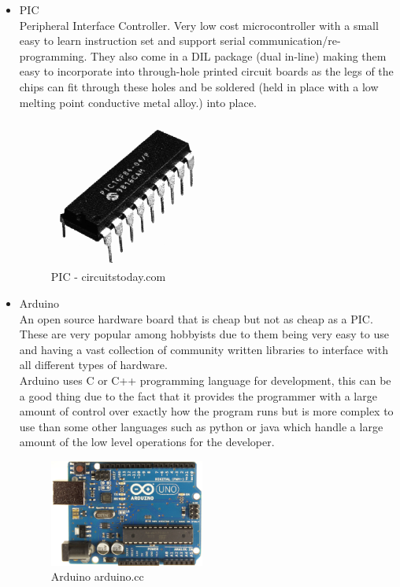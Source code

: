 \begin{itemize}
\item PIC
\\Peripheral Interface Controller.  Very low cost microcontroller with a small easy to learn instruction set and support serial communication/re-programming.  They also come in a DIL package (dual in-line) making them easy to incorporate into through-hole printed circuit boards as the legs of the chips can fit through these holes and be soldered (held in place with a low melting point conductive metal alloy.) into place.
\begin{figure}[H]
\centering
        \includegraphics[width=2.0in] {Images/pic-chip.png}
        \caption{PIC - circuitstoday.com}
        \label{PIC}
\end{figure}

\item Arduino
\\An open source hardware board that is cheap but not as cheap as a PIC.  These are very popular among hobbyists due to them being very easy to use and having a vast collection of community written libraries to interface with all different types of hardware.
\\Arduino uses C or C++ programming language for development, this can be a good thing due to the fact that it provides the programmer with a large amount of control over exactly how the program runs but is more complex to use than some other languages such as python or java which handle a large amount of the low level operations for the developer.
\begin{figure}[H]
\centering
        \includegraphics[width=2.0in] {Images/arduinouno-r3.jpg}
        \caption{Arduino arduino.cc}
        \label{Arduino}
\end{figure}


\end{itemize}
